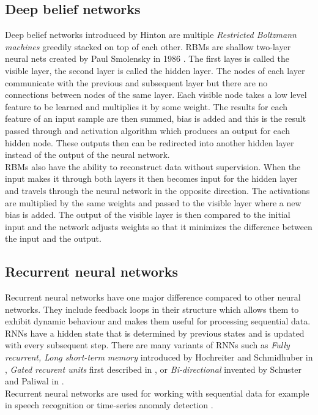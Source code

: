 \subsection{Deep belief networks}
Deep belief networks introduced by Hinton \cite{Hinton504} are multiple \textit{Restricted Boltzmann machines} greedily stacked on top of each other. RBMs are shallow two-layer neural nets created by Paul Smolensky in 1986 \cite{Smolensky1986InformationPI}. The first layes is called the visible layer, the second layer is called the hidden layer. The nodes of each layer communicate with the previous and subsequent layer but there are no connections between nodes of the same layer. Each visible node takes a low level feature to be learned and multiplies it by some weight. The results for each feature of an input sample are then summed, bias is added and this is the result passed through and activation algorithm which produces an output for each hidden node. These outputs then can be redirected into another hidden layer instead of the output of the neural network. \\
RBMs also have the ability to reconstruct data without supervision. When the input makes it through both layers it then becomes input for the hidden layer and travels through the neural network in the opposite direction. The activations are multiplied by the same weights and passed to the visible layer where a new bias is added. The output of the visible layer is then compared to the initial input and the network adjusts weights so that it minimizes the difference between the input and the output.

\subsection{Recurrent neural networks}
Recurrent neural networks have one major difference compared to other neural networks. They include feedback loops in their structure which allows them to exhibit dynamic behaviour and makes them useful for processing sequential data. RNNs have a hidden state that is determined by previous states and is updated with every subsequent step. There are many variants of RNNs such as \textit{Fully recurrent, Long short-term memory} introduced by Hochreiter and Schmidhuber in \cite{doi:10.1162/neco.1997.9.8.1735}, \textit{Gated recurent units} first described in \cite{cho-etal-2014-learning}, or \textit{Bi-directional} invented by Schuster and Paliwal in \cite{Schuster1997BidirectionalRN}. \\
Recurrent neural networks are used for working with sequential data for example in speech recognition \cite{DBLP:journals/corr/abs-1303-5778} or time-series anomaly detection \cite{inproceedings_RNN_anomaly_detection}.



